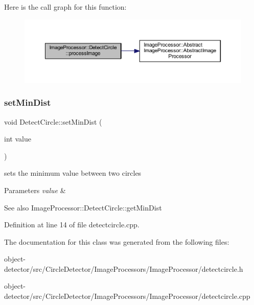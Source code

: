 Here is the call graph for this function\+:\nopagebreak
\begin{figure}[H]
\begin{center}
\leavevmode
\includegraphics[width=350pt]{d6/d8e/class_image_processor_1_1_detect_circle_ae0c7b4759827b218a03b16567233b4d5_cgraph}
\end{center}
\end{figure}
\mbox{\label{class_image_processor_1_1_detect_circle_a09bb7bbe753372179b49f94370800021}} 
\subsubsection{\texorpdfstring{set\+Min\+Dist}{setMinDist}}
{\footnotesize\ttfamily void Detect\+Circle\+::set\+Min\+Dist (\begin{DoxyParamCaption}\item[{int}]{value }\end{DoxyParamCaption})\hspace{0.3cm}{\ttfamily [slot]}}



sets the minimum value between two circles 


\begin{DoxyParams}{Parameters}
{\em value} & \\
\hline
\end{DoxyParams}
\begin{DoxySeeAlso}{See also}
Image\+Processor\+::\+Detect\+Circle\+::get\+Min\+Dist 
\end{DoxySeeAlso}


Definition at line 14 of file detectcircle.\+cpp.



The documentation for this class was generated from the following files\+:\begin{DoxyCompactItemize}
\item 
object-\/detector/src/\+Circle\+Detector/\+Image\+Processors/\+Image\+Processor/detectcircle.\+h\item 
object-\/detector/src/\+Circle\+Detector/\+Image\+Processors/\+Image\+Processor/detectcircle.\+cpp\end{DoxyCompactItemize}

